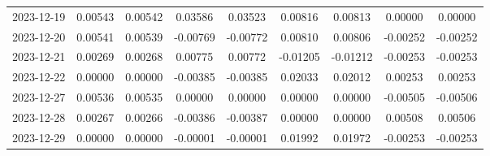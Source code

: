 {\begin{footnotesize}
\begin{longtable}{lcccccccc}
2023-12-19 & 0.00543 & 0.00542 & 0.03586 & 0.03523 & 0.00816 & 0.00813 & 0.00000 & 0.00000 \\
2023-12-20 & 0.00541 & 0.00539 & -0.00769 & -0.00772 & 0.00810 & 0.00806 & -0.00252 & -0.00252 \\
2023-12-21 & 0.00269 & 0.00268 & 0.00775 & 0.00772 & -0.01205 & -0.01212 & -0.00253 & -0.00253 \\
2023-12-22 & 0.00000 & 0.00000 & -0.00385 & -0.00385 & 0.02033 & 0.02012 & 0.00253 & 0.00253 \\
2023-12-27 & 0.00536 & 0.00535 & 0.00000 & 0.00000 & 0.00000 & 0.00000 & -0.00505 & -0.00506 \\
2023-12-28 & 0.00267 & 0.00266 & -0.00386 & -0.00387 & 0.00000 & 0.00000 & 0.00508 & 0.00506 \\
2023-12-29 & 0.00000 & 0.00000 & -0.00001 & -0.00001 & 0.01992 & 0.01972 & -0.00253 & -0.00253 \\
\end{longtable}
\end{footnotesize}

}
